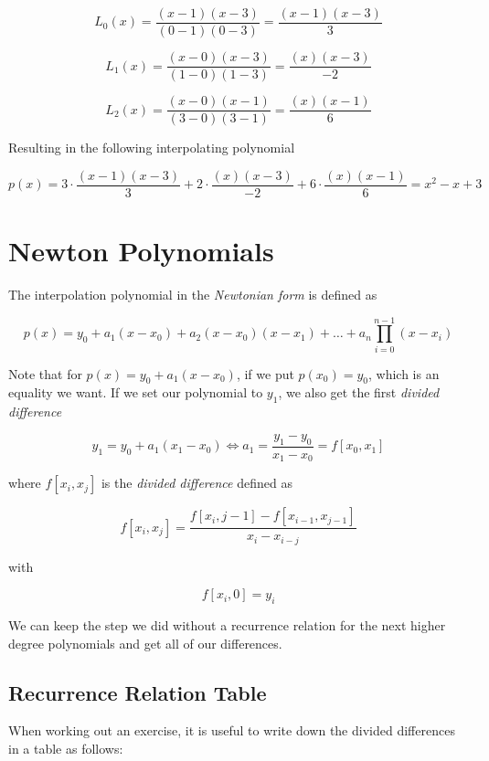 \[
    L_0(x) = \frac{(x - 1)(x - 3)}{(0 - 1)(0 - 3)} = \frac{(x - 1)(x - 3)}{3} 
\]

\[
    L_1(x) = \frac{(x - 0)(x - 3)}{(1 - 0)(1 - 3)} = \frac{(x)(x - 3)}{-2}
\]

\[
    L_2(x) = \frac{(x - 0)(x - 1)}{(3 - 0)(3 - 1)} = \frac{(x)(x - 1)}{6}
\]

Resulting in the following interpolating polynomial

\[
    p(x) = 3 \cdot \frac{(x - 1)(x - 3)}{3} + 2 \cdot \frac{(x)(x - 3)}{-2} + 6 \cdot \frac{(x)(x - 1)}{6} = x^2 - x + 3
\]


\section{Newton Polynomials}

The interpolation polynomial in the \emph{Newtonian form} is defined as 

\[
    p(x) = y_0 + a_1(x - x_0) + a_2(x - x_0)(x - x_1) + \dots + a_n \prod_{i = 0}^{n-1} (x - x_i)
\]

Note that for \(p(x) = y_0 + a_1(x - x_0)\), if we put \(p(x_0) = y_0\), which is an equality we want. If we set 
our polynomial to \(y_1\), we also get the first \emph{divided difference} 

\[
    y_1 = y_0 + a_1 (x_1 - x_0) \iff a_1 = \frac{y_1 - y_0}{x_1 - x_0} = f[x_0, x_1]
\]

where \(f[x_i, x_j]\) is the \emph{divided difference} defined as

\[
    f[x_i, x_j] = \frac{f[x_i, j -1] - f[x_{i - 1}, x_{j - 1}]}{x_i - x_{i - j}}
\]

with 

\[
    f[x_i, 0] = y_i
\]


We can keep the step we did without a recurrence relation for the next higher degree polynomials and get all of our differences.

\subsection{Recurrence Relation Table}

When working out an exercise, it is useful to write down the divided differences in a table as follows:

